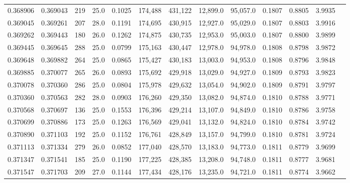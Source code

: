 \begin{tabular}{rrrrrrrrrrrrr}
0.368906 & 0.369043 &   219 & 25.0 &                                     0.1025 & 174,488 & 431,122 &  12,899.0 &  95,057.0 & 0.1807 & 0.8805 & 3.9935 \\
0.369045 & 0.369261 &   207 & 28.0 &                                     0.1191 & 174,695 & 430,915 &  12,927.0 &  95,029.0 & 0.1807 & 0.8803 & 3.9916 \\
0.369262 & 0.369443 &   180 & 26.0 &                                     0.1262 & 174,875 & 430,735 &  12,953.0 &  95,003.0 & 0.1807 & 0.8800 & 3.9899 \\
0.369445 & 0.369645 &   288 & 25.0 &                                     0.0799 & 175,163 & 430,447 &  12,978.0 &  94,978.0 & 0.1808 & 0.8798 & 3.9872 \\
0.369648 & 0.369882 &   264 & 25.0 &                                     0.0865 & 175,427 & 430,183 &  13,003.0 &  94,953.0 & 0.1808 & 0.8796 & 3.9848 \\
0.369885 & 0.370077 &   265 & 26.0 &                                     0.0893 & 175,692 & 429,918 &  13,029.0 &  94,927.0 & 0.1809 & 0.8793 & 3.9823 \\
0.370078 & 0.370360 &   286 & 25.0 &                                     0.0804 & 175,978 & 429,632 &  13,054.0 &  94,902.0 & 0.1809 & 0.8791 & 3.9797 \\
0.370360 & 0.370563 &   282 & 28.0 &                                     0.0903 & 176,260 & 429,350 &  13,082.0 &  94,874.0 & 0.1810 & 0.8788 & 3.9771 \\
0.370568 & 0.370697 &   136 & 25.0 &                                     0.1553 & 176,396 & 429,214 &  13,107.0 &  94,849.0 & 0.1810 & 0.8786 & 3.9758 \\
0.370699 & 0.370886 &   173 & 25.0 &                                     0.1263 & 176,569 & 429,041 &  13,132.0 &  94,824.0 & 0.1810 & 0.8784 & 3.9742 \\
0.370890 & 0.371103 &   192 & 25.0 &                                     0.1152 & 176,761 & 428,849 &  13,157.0 &  94,799.0 & 0.1810 & 0.8781 & 3.9724 \\
0.371113 & 0.371334 &   279 & 26.0 &                                     0.0852 & 177,040 & 428,570 &  13,183.0 &  94,773.0 & 0.1811 & 0.8779 & 3.9699 \\
0.371347 & 0.371541 &   185 & 25.0 &                                     0.1190 & 177,225 & 428,385 &  13,208.0 &  94,748.0 & 0.1811 & 0.8777 & 3.9681 \\
0.371547 & 0.371703 &   209 & 27.0 &                                     0.1144 & 177,434 & 428,176 &  13,235.0 &  94,721.0 & 0.1811 & 0.8774 & 3.9662 \\

\end{tabular}
